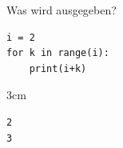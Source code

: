 \question[3]
Was wird ausgegeben?  
\begin{lstlisting}
i = 2
for k in range(i):
    print(i+k)
\end{lstlisting}
\begin{solutionbox}{3cm}
\begin{lstlisting}
2
3
\end{lstlisting}
\end{solutionbox}